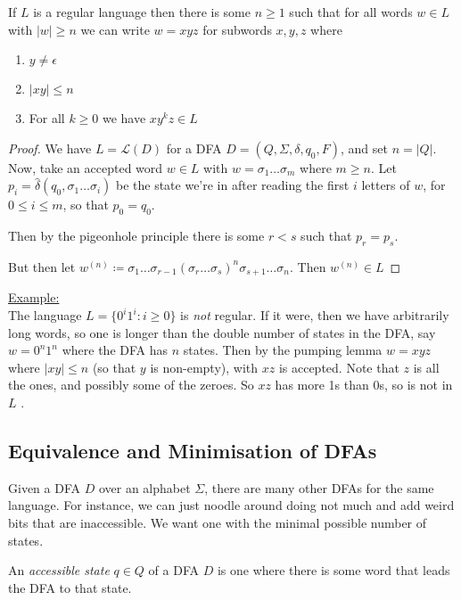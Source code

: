 \documentclass[10pt,a4paper]{article}
\begin{document}
\begin{theorem}
If $L$ is a regular language then there is some $n \geq 1$ such that for all words $w \in L$ with $|w| \geq n$ we can write $w = xyz$ for subwords $x, y, z$ where
\begin{enumerate}
\item $y \neq \epsilon$
\item $|xy| \leq n$
\item For all $k \geq 0$ we have $xy^k z \in L$
\end{enumerate}
\end{theorem}
\begin{proof}
We have $L = \mathcal{L}(D)$ for a DFA $D = (Q, \Sigma, \delta, q_0, F)$, and set $n = |Q|$. Now, take an accepted word $w \in L$ with $w = \sigma_1\ldots\sigma_m$ where $m \geq n$. Let $p_i = \hat{\delta}(q_0, \sigma_1\ldots\sigma_i)$ be the state we're in after reading the first $i$ letters of $w$, for $0 \leq i \leq m$, so that $p_0 =q_0$. 

Then by the pigeonhole principle there is some $r < s$ such that $p_r = p_s$.

But then let $w^{(n)} \coloneqq \sigma_1\ldots\sigma_{r-1}(\sigma_r\ldots\sigma_s)^n\sigma_{s+1}\ldots\sigma_n$. Then $w^{(n)} \in L$ 
\end{proof}

\underline{Example:}\\
The language $L = \{0^i 1^i : i \geq 0\}$ is \textit{not} regular. If it were, then we have arbitrarily long words, so one is longer than the double number of states in the DFA, say $w = 0^n1^n$ where the DFA has $n$ states. Then by the pumping lemma $w = xyz$ where $|xy|\leq n$ (so that $y$ is non-empty), with $xz$ is accepted. Note that $z$ is all the ones, and possibly some of the zeroes. So $xz$ has more 1s than 0s, so is not in $L$ \contr.

\subsection*{Equivalence and Minimisation of DFAs}
Given a DFA $D$ over an alphabet $\Sigma$, there are many other DFAs for the same language. For instance, we can just noodle around doing not much and add weird bits that are inaccessible. We want one with the minimal possible number of states.

An \emph{accessible state} $q \in Q$ of a DFA $D$ is one where there is some word that leads the DFA to that state.
\end{document}
